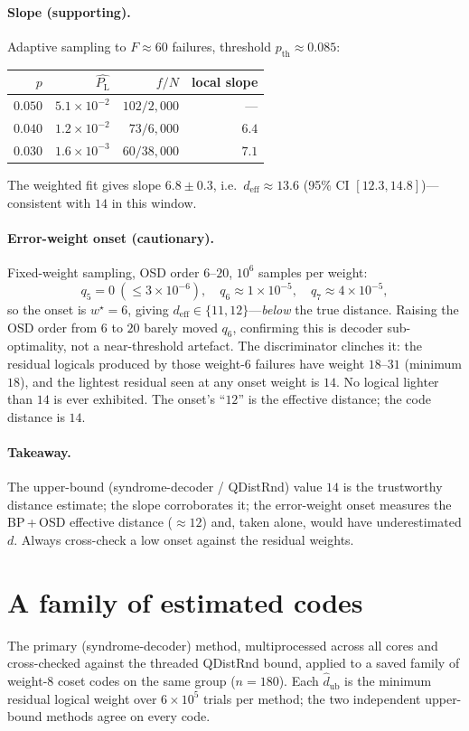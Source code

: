 \documentclass[11pt]{article}
\newcommand{\PL}{P_{\mathrm{L}}}
\newcommand{\dub}{\hat d_{\mathrm{ub}}}
\newcommand{\deff}{d_{\mathrm{eff}}}
\begin{document}
\paragraph{Slope (supporting).} Adaptive sampling to $F\approx 60$ failures,
threshold $p_{\mathrm{th}}\approx 0.085$:
\begin{center}
\begin{tabular}{rrrr}
\toprule
$p$ & $\widehat{\PL}$ & $f/N$ & local slope \\
\midrule
$0.050$ & $5.1\times10^{-2}$ & $102/2{,}000$   & ---  \\
$0.040$ & $1.2\times10^{-2}$ & $73/6{,}000$    & $6.4$ \\
$0.030$ & $1.6\times10^{-3}$ & $60/38{,}000$   & $7.1$ \\
\bottomrule
\end{tabular}
\end{center}
The weighted fit gives slope $6.8\pm0.3$, i.e.\ $\deff\approx 13.6$ (95\% CI
$[12.3,14.8]$)---consistent with $14$ in this window.

\paragraph{Error-weight onset (cautionary).} Fixed-weight sampling, OSD order
$6$--$20$, $10^6$ samples per weight:
\[
  q_5=0\ (\le 3\times10^{-6}),\quad q_6\approx 1\times10^{-5},\quad
  q_7\approx 4\times10^{-5},
\]
so the onset is $w^\star=6$, giving $\deff\in\{11,12\}$---\emph{below} the true
distance. Raising the OSD order from $6$ to $20$ barely moved $q_6$, confirming
this is decoder sub-optimality, not a near-threshold artefact. The discriminator
clinches it: the residual logicals produced by those weight-$6$ failures have
weight $18$--$31$ (minimum $18$), and the lightest residual seen at any onset
weight is $14$. No logical lighter than $14$ is ever exhibited. The onset's
``$12$'' is the effective distance; the code distance is $14$.

\paragraph{Takeaway.} The upper-bound (syndrome-decoder / QDistRnd) value $14$ is
the trustworthy distance estimate; the slope corroborates it; the error-weight
onset measures the BP\,+\,OSD effective distance ($\approx12$) and, taken alone,
would have underestimated $d$. Always cross-check a low onset against the residual
weights.

\section{A family of estimated codes}
\label{app:family}
The primary (syndrome-decoder) method, multiprocessed across all cores and
cross-checked against the threaded QDistRnd bound, applied to a saved family of
weight-$8$ coset codes on the same group ($n=180$). Each $\dub$ is the minimum
residual logical weight over $6\times10^5$ trials per method; the two independent
upper-bound methods agree on every code.
\end{document}
